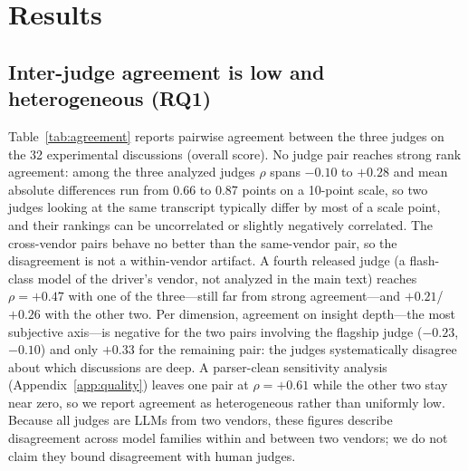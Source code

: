 \section{Results}
\label{sec:results}



\subsection{Inter-judge agreement is low and heterogeneous (RQ1)}

Table~\ref{tab:agreement} reports pairwise agreement between the three
judges on the 32 experimental discussions (overall score). No judge
pair reaches strong rank agreement: among the three analyzed judges
$\rho$ spans $-0.10$ to $+0.28$ and mean absolute differences run from
0.66 to 0.87 points on a 10-point scale, so two judges looking at the
same transcript typically differ by most of a scale point, and their
rankings can be uncorrelated or slightly negatively correlated. The
cross-vendor pairs behave no better than the same-vendor pair, so the
disagreement is not a within-vendor artifact. A fourth released judge
(a flash-class model of the driver's vendor, not analyzed in the main
text) reaches $\rho=+0.47$ with one of the three---still far from
strong agreement---and $+0.21$/$+0.26$ with the other two. Per
dimension, agreement on insight depth---the most subjective axis---is
negative for the two pairs involving the flagship judge ($-0.23$,
$-0.10$) and only $+0.33$ for the remaining pair: the judges
systematically disagree about which discussions are deep. A
parser-clean sensitivity analysis (Appendix~\ref{app:quality}) leaves
one pair at $\rho=+0.61$ while the other two stay near zero, so we
report agreement as heterogeneous rather than uniformly low. Because all
judges are LLMs from two vendors, these figures describe disagreement
across model families within and between two vendors; we do not claim
they bound disagreement with human judges.

